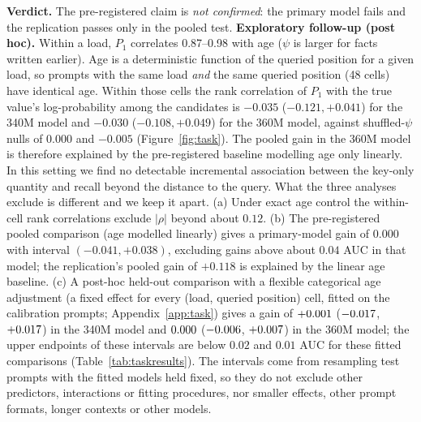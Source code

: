 \documentclass{article}
\begin{document}
\textbf{Verdict.} The pre-registered claim is \emph{not confirmed}: the primary model fails and the replication passes only in the pooled test. \textbf{Exploratory follow-up (post hoc).} Within a load, $P_1$ correlates 0.87--0.98 with age ($\psi$ is larger for facts written earlier). Age is a deterministic function of the queried position for a given load, so prompts with the same load \emph{and} the same queried position (48 cells) have identical age. Within those cells the rank correlation of $P_1$ with the true value's log-probability among the candidates is $-0.035$ ($-0.121,+0.041$) for the 340M model and $-0.030$ ($-0.108,+0.049$) for the 360M model, against shuffled-$\psi$ nulls of $0.000$ and $-0.005$ (Figure~\ref{fig:task}). The pooled gain in the 360M model is therefore explained by the pre-registered baseline modelling age only linearly. In this setting we find no detectable incremental association between the key-only quantity and recall beyond the distance to the query. What the three analyses exclude is different and we keep it apart. (a) Under exact age control the within-cell rank correlations exclude $|\rho|$ beyond about $0.12$. (b) The pre-registered pooled comparison (age modelled linearly) gives a primary-model gain of $0.000$ with interval $(-0.041,+0.038)$, excluding gains above about $0.04$ AUC in that model; the replication's pooled gain of $+0.118$ is explained by the linear age baseline. (c) A post-hoc held-out comparison with a flexible categorical age adjustment (a fixed effect for every (load, queried position) cell, fitted on the calibration prompts; Appendix~\ref{app:task}) gives a gain of $+0.001$ ($-0.017$, $+0.017$) in the 340M model and $0.000$ ($-0.006$, $+0.007$) in the 360M model; the upper endpoints of these intervals are below $0.02$ and $0.01$ AUC for these fitted comparisons (Table~\ref{tab:taskresults}). The intervals come from resampling test prompts with the fitted models held fixed, so they do not exclude other predictors, interactions or fitting procedures, nor smaller effects, other prompt formats, longer contexts or other models.

\begin{table}[ht]
  \caption{Task-level results side by side (95\% bootstrap intervals). $\Delta$AUC is the held-out AUC gain from adding $P_1$: the pre-registered comparison models age linearly; the categorical-age comparison (a fixed effect for every load and queried position) and the within-cell rank correlation are post hoc.}\label{tab:taskresults}
  \centering\setlength{\tabcolsep}{5pt}
  
\end{table}
\end{document}
